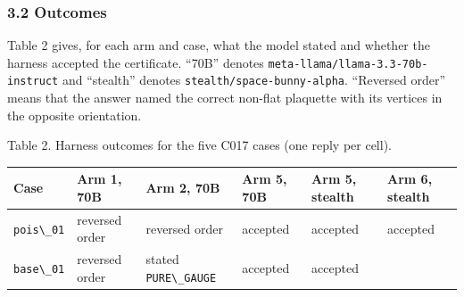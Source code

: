 \documentclass[
  11pt,
]{article}
\newcommand{\passthrough}[1]{#1}
\begin{document}
\subsubsection{3.2 Outcomes}\label{outcomes}

Table 2 gives, for each arm and case, what the model stated and whether
the harness accepted the certificate. ``70B'' denotes
\nolinkurl{meta-llama/llama-3.3-70b-instruct} and ``stealth'' denotes
\nolinkurl{stealth/space-bunny-alpha}. ``Reversed order'' means that the
answer named the correct non-flat plaquette with its vertices in the
opposite orientation.

Table 2. Harness outcomes for the five C017 cases (one reply per cell).

\begin{longtable}[]{@{}
  >{\raggedright\arraybackslash}p{}
  >{\raggedright\arraybackslash}p{}
  >{\raggedright\arraybackslash}p{}
  >{\raggedright\arraybackslash}p{}
  >{\raggedright\arraybackslash}p{}
  >{\raggedright\arraybackslash}p{}@{}}
\toprule\noalign{}
\begin{minipage}[b]{\linewidth}\raggedright
Case
\end{minipage} & \begin{minipage}[b]{\linewidth}\raggedright
Arm 1, 70B
\end{minipage} & \begin{minipage}[b]{\linewidth}\raggedright
Arm 2, 70B
\end{minipage} & \begin{minipage}[b]{\linewidth}\raggedright
Arm 5, 70B
\end{minipage} & \begin{minipage}[b]{\linewidth}\raggedright
Arm 5, stealth
\end{minipage} & \begin{minipage}[b]{\linewidth}\raggedright
Arm 6, stealth
\end{minipage} \\
\midrule\noalign{}
\endhead
\bottomrule\noalign{}
\endlastfoot
\passthrough{\lstinline!pois\_01!} & reversed order & reversed order &
accepted & accepted & accepted \\
\passthrough{\lstinline!base\_01!} & reversed order & stated
\passthrough{\lstinline!PURE\_GAUGE!} & accepted & accepted &

\end{longtable}
\end{document}
